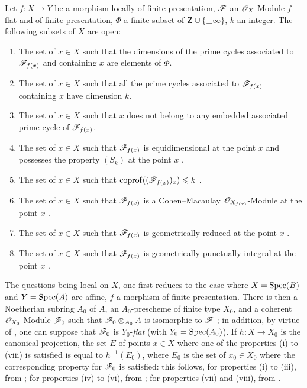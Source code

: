\begin{theorem}[12.1.1]
\label{IV.12.1.1}
Let $f:X\to Y$ be a morphism locally of finite presentation, $\mathscr{F}$ an $\mathscr{O}_X$-Module $f$-flat and of finite presentation, $\Phi$ a finite subset of $\mathbf{Z}\cup\{\pm\infty\}$, $k$ an integer.
The following subsets of $X$ are open:
\begin{enumerate}[label=\textup{(\roman*)}]
  \item The set of $x\in X$ such that the dimensions of the prime cycles associated to $\mathscr{F}_{f(x)}$ and containing $x$ are elements of $\Phi$.
  \item The set of $x\in X$ such that all the prime cycles associated to $\mathscr{F}_{f(x)}$ containing $x$ have dimension $k$.
  \item The set of $x\in X$ such that $x$ does not belong to any embedded associated prime cycle of $\mathscr{F}_{f(x)}$.
  \item The set of $x\in X$ such that $\mathscr{F}_{f(x)}$ is \textup{equidimensional} at the point $x$ and possesses the property $(S_k)$ at the point $x$ .
  \item The set of $x\in X$ such that $\operatorname{coprof}((\mathscr{F}_{f(x)})_x)\leqslant k$ .
  \item The set of $x\in X$ such that $\mathscr{F}_{f(x)}$ is a Cohen--Macaulay $\mathscr{O}_{X_{f(x)}}$-Module at the point $x$ .
  \item The set of $x\in X$ such that $\mathscr{F}_{f(x)}$ is geometrically reduced at the point $x$ .
  \item The set of $x\in X$ such that $\mathscr{F}_{f(x)}$ is geometrically punctually integral at the point $x$ .
\end{enumerate}

The questions being local on $X$, one first reduces to the case where $X=\operatorname{Spec}(B)$ and $Y=\operatorname{Spec}(A)$ are affine, $f$ a morphism of finite presentation.
There is then a Noetherian subring $A_0$ of $A$, an $A_0$-prescheme of finite type $X_0$, and a coherent $\mathscr{O}_{X_0}$-Module $\mathscr{F}_0$ such that $\mathscr{F}_0\otimes_{A_0}A$ is isomorphic to $\mathscr{F}$ ; in addition, by virtue of , one can suppose that $\mathscr{F}_0$ is $Y_0$-\emph{flat} (with $Y_0=\operatorname{Spec}(A_0)$).
If $h:X\to X_0$ is the canonical projection, the set $E$ of points $x\in X$ where one of the properties (i) to (viii) is satisfied is equal to $h^{-1}(E_0)$, where $E_0$ is the set of $x_0\in X_0$ where the corresponding property for $\mathscr{F}_0$ is satisfied: this follows, for properties (i) to (iii), from ; for properties (iv) to (vi), from ; for properties (vii) and (viii), from .
\end{theorem}

